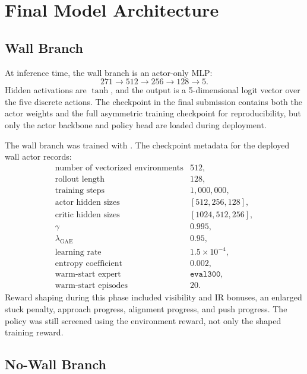 \documentclass[11pt, oneside]{article}   	%
\begin{document}
\section{Final Model Architecture}

\subsection{Wall Branch}

At inference time, the wall branch is an actor-only MLP:
\[
  271 \rightarrow 512 \rightarrow 256 \rightarrow 128 \rightarrow 5.
\]
Hidden activations are \(\tanh\), and the output is a 5-dimensional logit vector over the
five discrete actions. The checkpoint in the final submission contains both the actor
weights and the full asymmetric training checkpoint for reproducibility, but only the
actor backbone and policy head are loaded during deployment.

The wall branch was trained with . The checkpoint
metadata for the deployed wall actor records:
\[
\begin{array}{ll}
\text{number of vectorized environments} & 512,\\
\text{rollout length} & 128,\\
\text{training steps} & 1{,}000{,}000,\\
\text{actor hidden sizes} & [512,256,128],\\
\text{critic hidden sizes} & [1024,512,256],\\
\gamma & 0.995,\\
\lambda_{\text{GAE}} & 0.95,\\
\text{learning rate} & 1.5\times 10^{-4},\\
\text{entropy coefficient} & 0.002,\\
\text{warm-start expert} & \texttt{eval300},\\
\text{warm-start episodes} & 20.
\end{array}
\]
Reward shaping during this phase included visibility and IR bonuses, an enlarged stuck
penalty, approach progress, alignment progress, and push progress. The policy was still
screened using the environment reward, not only the shaped training reward.

\subsection{No-Wall Branch}
\end{document}
